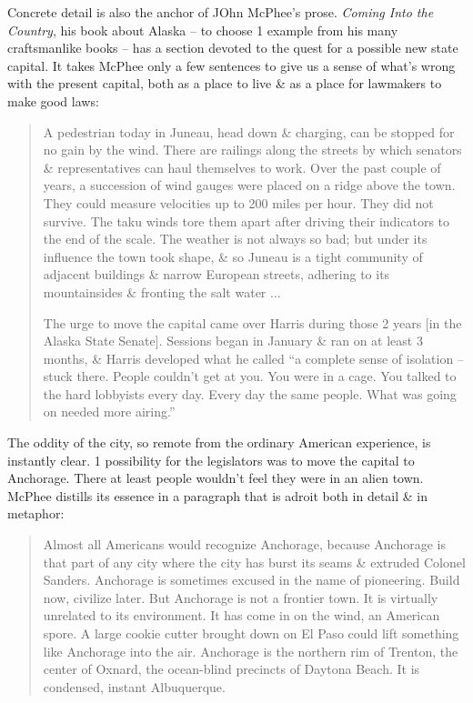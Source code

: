 \documentclass{article}
\begin{document}
Concrete detail is also the anchor of JOhn McPhee's prose. \textit{Coming Into the Country}, his book about Alaska -- to choose 1 example from his many craftsmanlike books -- has a section devoted to the quest for a possible new state capital. It takes McPhee only a few sentences to give us a sense of what's wrong with the present capital, both as a place to live \& as a place for lawmakers to make good laws:
\begin{quotation}
	A pedestrian today in Juneau, head down \& charging, can be stopped for no gain by the wind. There are railings along the streets by which senators \& representatives can haul themselves to work. Over the past couple of years, a succession of wind gauges were placed on a ridge above the town. They could measure velocities up to 200 miles per hour. They did not survive. The taku winds tore them apart after driving their indicators to the end of the scale. The weather is not always so bad; but under its influence the town took shape, \& so Juneau is a tight community of adjacent buildings \& narrow European streets, adhering to its mountainsides \& fronting the salt water $\ldots$
	
	The urge to move the capital came over Harris during those 2 years [in the Alaska State Senate]. Sessions began in January \& ran on at least 3 months, \& Harris developed what he called ``a complete sense of isolation -- stuck there. People couldn't get at you. You were in a cage. You talked to the hard lobbyists every day. Every day the same people. What was going on needed more airing.''
\end{quotation}
The oddity of the city, so remote from the ordinary American experience, is instantly clear. 1 possibility for the legislators was to move the capital to Anchorage. There at least people wouldn't feel they were in an alien town. McPhee distills its essence in a paragraph that is adroit both in detail \& in metaphor:
\begin{quotation}
	Almost all Americans would recognize Anchorage, because Anchorage is that part of any city where the city has burst its seams \& extruded Colonel Sanders. Anchorage is sometimes excused in the name of pioneering. Build now, civilize later. But Anchorage is not a frontier town. It is virtually unrelated to its environment. It has come in on the wind, an American spore. A large cookie cutter brought down on El Paso could lift something like Anchorage into the air. Anchorage is the northern rim of Trenton, the center of Oxnard, the ocean-blind precincts of Daytona Beach. It is condensed, instant Albuquerque.
\end{quotation}
\end{document}
